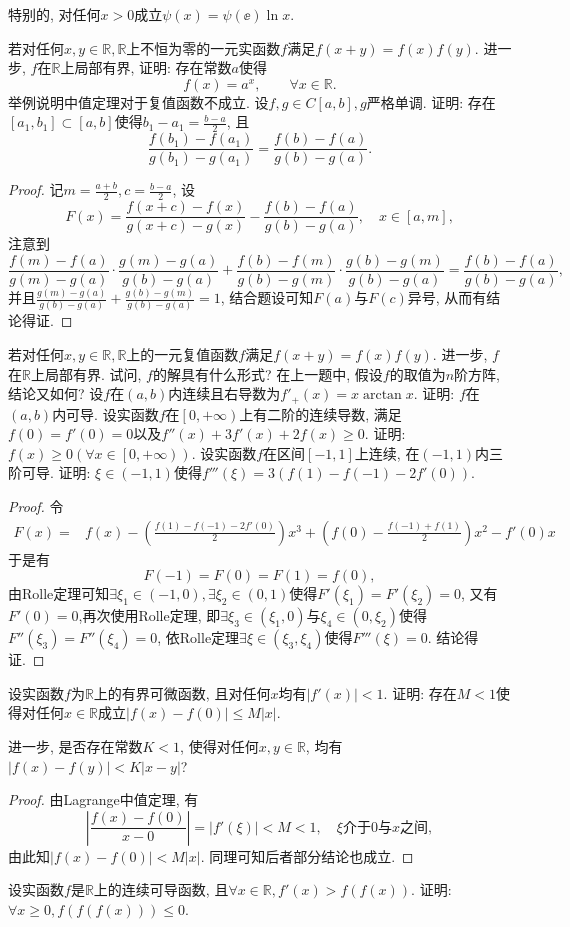 \begin{quiza}
\begin{quizs}
特别的, 对任何\(x>0\)成立\(\psi(x)=\psi(\ee)\ln x.\)
\end{quizs}
\woe 若对任何\(x,y\in\mathbb{R},\mathbb{R}\)上不恒为零的一元实函数\(f\)满足\(f(x+y)=f(x)f(y)\). 进一步, \(f\)在\(\mathbb{R}\)上局部有界, 证明: 存在常数\(a\)使得\[f(x)=a^x,\qquad\forall x\in\mathbb{R}.\]
\woe 举例说明中值定理对于复值函数不成立.
\woe 设\(f,g\in C[a,b],g\)严格单调. 证明: 存在\([a_1,b_1]\subset [a,b]\)使得\(b_1-a_1=\frac{b-a}{2}\), 且\[\frac{f(b_1)-f(a_1)}{g(b_1)-g(a_1)}=\frac{f(b)-f(a)}{g(b)-g(a)}.\]
\begin{proof}
记\(m=\frac{a+b}{2},c=\frac{b-a}{2}\), 设\[F(x)=\frac{f(x+c)-f(x)}{g(x+c)-g(x)}-\frac{f(b)-f(a)}{g(b)-g(a)},\quad x\in[a,m],\]注意到\[\frac{f(m)-f(a)}{g(m)-g(a)}\cdot\frac{g(m)-g(a)}{g(b)-g(a)}+\frac{f(b)-f(m)}{g(b)-g(m)}\cdot\frac{g(b)-g(m)}{g(b)-g(a)}=\frac{f(b)-f(a)}{g(b)-g(a)},\]并且\(\frac{g(m)-g(a)}{g(b)-g(a)}+\frac{g(b)-g(m)}{g(b)-g(a)}=1\), 结合题设可知\(F(a)\)与\(F(c)\)异号, 从而有结论得证.
\end{proof}
\end{quiza}
\begin{quizb}
\woe 若对任何\(x,y\in\mathbb{R},\mathbb{R}\)上的一元复值函数\(f\)满足\(f(x+y)=f(x)f(y)\). 进一步, \(f\)在\(\mathbb{R}\)上局部有界. 试问, \(f\)的解具有什么形式?
\woe 在上一题中, 假设\(f\)的取值为\(n\)阶方阵, 结论又如何?
\woe 设\(f\)在\((a,b)\)内连续且右导数为\(f'_+(x)=x\arctan x\). 证明: \(f\)在\((a,b)\)内可导.
\woe 设实函数\(f\)在\(\left[0,+\infty\right)\)上有二阶的连续导数, 满足\(f(0)=f'(0)=0\)以及\(f''(x)+3f'(x)+2f(x)\geqslant 0\). 证明: \(f(x)\geqslant 0\left(\forall x\in \left[0,+\infty\right)\right)\).
\woe 设实函数\(f\)在区间\([-1,1]\)上连续, 在\((-1,1)\)内三阶可导. 证明: \(\xi\in(-1,1)\)使得\(f'''(\xi)=3\left(f(1)-f(-1)-2f'(0)\right)\).
\begin{proof}
令\[\begin{split}
F(x)=&f(x)-\left(\frac{f(1)-f(-1)-2f'(0)}{2}\right)x^3+\left(f(0)-\frac{f(-1)+f(1)}{2}\right)x^2-f'(0)x
\end{split}\]于是有\[F(-1)=F(0)=F(1)=f(0),\]由Rolle定理可知\(\exists \xi_1\in(-1,0),\exists \xi_2\in(0,1)\)使得\(F'(\xi_1)=F'(\xi_2)=0\), 又有\(F'(0)=0\),再次使用Rolle定理, 即\(\exists \xi_3\in(\xi_1,0)\)与\(\xi_4\in(0,\xi_2)\)使得\(F''(\xi_3)=F''(\xi_4)=0\), 依Rolle定理\(\exists \xi\in(\xi_3,\xi_4)\)使得\(F'''(\xi)=0\). 结论得证.
\end{proof}
\woe 设实函数\(f\)为\(\mathbb{R}\)上的有界可微函数, 且对任何\(x\)均有\(|f'(x)|<1.\) 证明: 存在\(M<1\)使得对任何\(x\in\mathbb{R}\)成立\(|f(x)-f(0)|\leqslant M|x|\).

进一步, 是否存在常数\(K<1\), 使得对任何\(x,y\in\mathbb{R}\), 均有\(|f(x)-f(y)|<K|x-y|\)?
\begin{proof}
由Lagrange中值定理, 有\[\left|\frac{f(x)-f(0)}{x-0}\right|=|f'(\xi)|<M<1,\quad \xi\text{介于\(0\)与\(x\)之间},\]由此知\(|f(x)-f(0)|<M|x|\). 同理可知后者部分结论也成立.
\end{proof}
\woe 设实函数\(f\)是\(\mathbb{R}\)上的连续可导函数, 且\(\forall x\in\mathbb{R}, f'(x)>f\left(f(x)\right)\). 证明: \(\forall x\geqslant 0,f\left(f\left(f(x)\right)\right)\leqslant 0\).
\end{quizb}
